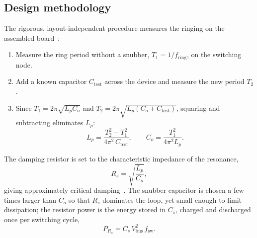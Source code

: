 \documentclass[journal,onecolumn,11pt]{IEEEtran}
\newcommand{\Vbus}{V_{\mathrm{bus}}}
\newcommand{\fsw}{f_{\mathrm{sw}}}
\begin{document}
\subsection{Design methodology}
The rigorous, layout-independent procedure measures the ringing on the assembled board~\cite{severns}:
\begin{enumerate}[leftmargin=1.4em]
\item Measure the ring period without a snubber, $T_1=1/f_{\mathrm{ring}}$, on the switching node.
\item Add a known capacitor $C_{\mathrm{test}}$ across the device and measure the new period $T_2$.
\item Since $T_1=2\pi\sqrt{L_pC_o}$ and $T_2=2\pi\sqrt{L_p(C_o+C_{\mathrm{test}})}$, squaring and
subtracting eliminates $L_p$:
\begin{equation}
L_p=\frac{T_2^{2}-T_1^{2}}{4\pi^{2}\,C_{\mathrm{test}}},\qquad
C_o=\frac{T_1^{2}}{4\pi^{2}L_p}.
\label{eq:extract}
\end{equation}
\end{enumerate}
The damping resistor is set to the characteristic impedance of the resonance,
\begin{equation}
R_s=\sqrt{\frac{L_p}{C_o}},
\label{eq:rs}
\end{equation}
giving approximately critical damping~\cite{severns}. The snubber capacitor is chosen a few times
larger than $C_o$ so that $R_s$ dominates the loop, yet small enough to limit dissipation; the
resistor power is the energy stored in $C_s$, charged and discharged once per switching cycle,
\begin{equation}
P_{R_s}=C_s\,\Vbus^{2}\,\fsw .
\label{eq:psnub}
\end{equation}
\end{document}
